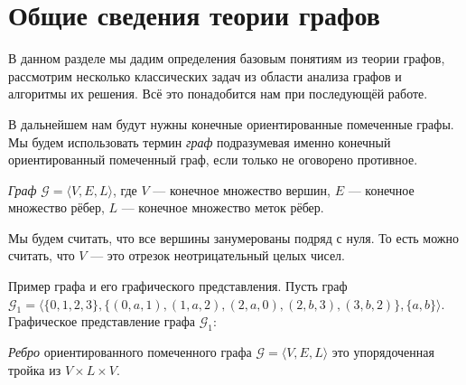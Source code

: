 \section{Общие сведения теории графов}

В данном разделе мы дадим определения базовым понятиям из теории графов, рассмотрим несколько классических задач из области анализа графов и алгоритмы их решения.
Всё это понадобится нам при последующёй работе.

В дальнейшем нам будут нужны конечные ориентированные помеченные графы.
Мы будем использовать термин \textit{граф} подразумевая именно конечный ориентированный помеченный граф, если только не оговорено противное.

\begin{definition}
  \textit{Граф} $\mathcal{G} = \langle V, E, L \rangle$, где $V$ --- конечное множество вершин, $E$ --- конечное множество рёбер, $L$ --- конечное множество меток рёбер.
\end{definition}

Мы будем считать, что все вершины занумерованы подряд с нуля.
То есть можно считать, что $V$ --- это отрезок неотрицательный целых чисел.

\begin{example}
  Пример графа и его графического представления.
  Пусть граф $\mathcal{G}_1 = \langle \{0,1,2,3\}, \{(0,a,1), (1,a,2), (2,a,0), (2,b,3), (3,b,2)\}, \{a,b\} \rangle$.
  Графическое представление графа $\mathcal{G}_1$:
  \begin{center}
  \end{center}
\end{example}

\begin{definition}
  \textit{Ребро} ориентированного помеченного графа $\mathcal{G} = \langle V, E, L \rangle$ это упорядоченная тройка из $V \times L \times V$.
\end{definition}

